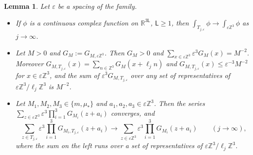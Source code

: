 \documentclass[11pt]{amsart}
\theoremstyle{plain}
\newtheorem{lemma}[theorem]{Lemma}
\theoremstyle{definition}
\theoremstyle{remark}
\numberwithin{equation}{section}
\newcommand{\R}{\mathbb{R}}
\newcommand{\Z}{\mathbb{Z}}
\newcommand{\eps}{\varepsilon}
\begin{document}
\begin{lemma}\label{lem:riemann}
Let $\eps$ be a spacing of the family.
\begin{itemize}
\item[(a)] If $\phi$ is a continuous complex function on $\R^{3\mathsf L}$, $\mathsf L\ge1$, then $\int_{T_{j,\eps}}\phi\to\int_{\eps\Z^3}\phi$ as $j\to\infty$.
\item[(b)] Let $M>0$ and $G_M:=G_{M,\eps\Z^3}$. Then $G_M>0$ and $\sum_{x\in\eps\Z^3}\eps^3G_M(x)=M^{-2}$. Moreover $G_{M,T_{j,\eps}}(x)=\sum_{n\in\Z^3}G_M(x+\ell_jn)$ and $G_{M,T_{j,\eps}}(x)\le\eps^{-3}M^{-2}$ for $x\in\eps\Z^3$, and the sum of $\eps^3G_{M,T_{j,\eps}}$ over any set of representatives of $\eps\Z^3/\ell_j\Z^3$ is $M^{-2}$.
\item[(c)] Let $M_1,M_2,M_3\in\{m,\mu_*\}$ and $a_1,a_2,a_3\in\eps\Z^3$. Then the series $\sum_{z\in\eps\Z^3}\eps^3\prod_{i=1}^3G_{M_i}(z+a_i)$ converges, and
\[
\sum_{z\in T_{j,\eps}}\eps^3\prod_{i=1}^3G_{M_i,T_{j,\eps}}(z+a_i)\to\sum_{z\in\eps\Z^3}\eps^3\prod_{i=1}^3G_{M_i}(z+a_i)\qquad(j\to\infty),
\]
where the sum on the left runs over a set of representatives of $\eps\Z^3/\ell_j\Z^3$.
\end{itemize}
\end{lemma}
\end{document}
